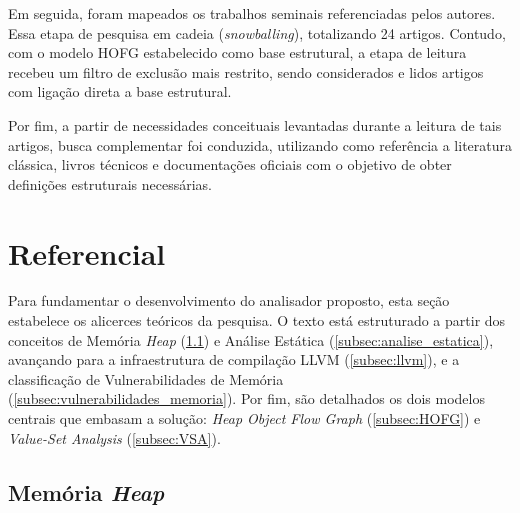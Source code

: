 \documentclass[
    12pt,                %
    openright,           %
    oneside,             %
    a4paper,             %
    english,             %
    brazil               %
]{abntex2}
\begin{document}
\par 
Em seguida, foram mapeados os trabalhos seminais referenciadas pelos autores. Essa etapa de pesquisa em cadeia (\textit{snowballing}), totalizando 24 artigos. Contudo, com o modelo HOFG estabelecido como base estrutural, a etapa de leitura recebeu um filtro de exclusão mais restrito, sendo considerados e lidos artigos com ligação direta a base estrutural.

\par
Por fim, a partir de necessidades conceituais levantadas durante a leitura de tais artigos, busca complementar foi conduzida, utilizando como referência a literatura clássica, livros técnicos e documentações oficiais com o objetivo de obter definições estruturais necessárias.


\section{Referencial}
\label{sec:referencial}

Para fundamentar o desenvolvimento do analisador proposto, esta seção estabelece os alicerces teóricos da pesquisa. O texto está estruturado a partir dos conceitos de Memória \textit{Heap} (\ref{subsec:HEAP}) e Análise Estática (\ref{subsec:analise_estatica}), 
avançando para a infraestrutura de compilação LLVM (\ref{subsec:llvm}), e a classificação de Vulnerabilidades de Memória (\ref{subsec:vulnerabilidades_memoria}). Por fim, são detalhados os dois modelos centrais que embasam a solução: \textit{Heap Object Flow Graph} (\ref{subsec:HOFG}) e \textit{Value-Set Analysis} (\ref{subsec:VSA}).

\subsection{Memória \textit{Heap}}
\label{subsec:HEAP}
\end{document}
